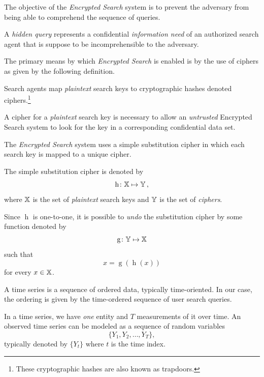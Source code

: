 \documentclass[final,
  11pt,
]{article}
\begin{document}
The objective of the \emph{Encrypted Search} system is to prevent the
adversary from being able to comprehend the sequence of queries.
\begin{definition}
A \emph{hidden query} represents a confidential \emph{information need} of an
authorized search agent that is suppose to be incomprehensible to the adversary.
\end{definition}

The primary means by which \emph{Encrypted Search} is enabled is by the
use of ciphers as given by the following definition.

\begin{definition}
Search agents map \emph{plaintext} search keys to
cryptographic hashes denoted ciphers.\footnote{These cryptographic hashes are also known as trapdoors.}
\end{definition}

A cipher for a \emph{plaintext} search key is necessary to allow an
\emph{untrusted} Encrypted Search system to look for the key in a
corresponding confidential data set.

\begin{assumption}
The \emph{Encrypted Search} system uses a simple substitution cipher in which
each search key is mapped to a unique cipher.
\end{assumption}

The simple substitution cipher is denoted by
\begin{equation}
    \operatorname{h} \colon \mathbb{X} \mapsto \mathbb{Y}\,,
\end{equation} where \(\mathbb{X}\) is the set of \emph{plaintext} search
keys and \(\mathbb{Y}\) is the set of \emph{ciphers}.

Since \(\operatorname{h}\) is one-to-one, it is possible to \emph{undo}
the substitution cipher by some function denoted by \begin{equation}
    \operatorname{g} \colon \mathbb{Y} \mapsto \mathbb{X}
\end{equation} such that \[
    x = \operatorname{g}(\operatorname{h}(x))
\] for every \(x \in \mathbb{X}\).

A time series is a sequence of ordered data, typically time-oriented.
In our case, the ordering is given by the time-ordered sequence of
user search queries.

In a time series, we have \emph{one} entity and \(T\) measurements of
it over time.
An observed time series can be modeled as a sequence of random variables
\[
  \{Y_1,Y_2,\ldots,Y_T\},
\]
typically denoted by \(\{Y_t\}\) where \(t\) is the time index.
\end{document}
